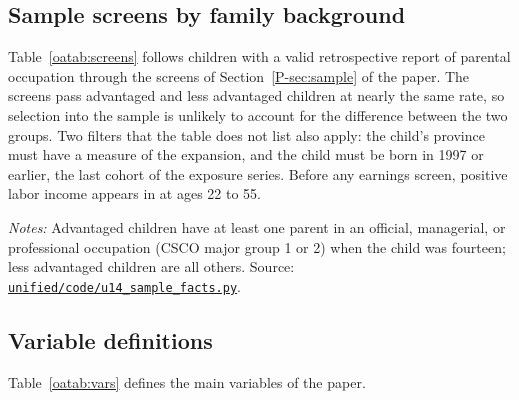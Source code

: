 \documentclass[11pt]{article}
\numberwithin{equation}{section}
\newcommand{\repourl}{https://github.com/JiachenJin1001/before-the-labor-market-or-inside-it}
\newcommand{\code}[1]{\href{\repourl/blob/main/#1}{\nolinkurl{#1}}}
\begin{document}
\subsection{Sample screens by family background}

Table~\ref{oatab:screens} follows children with a valid retrospective
report of parental occupation through the screens of
Section~\ref{P-sec:sample} of the paper. The screens pass advantaged
and less advantaged children at nearly the same rate, so selection into the sample is unlikely to account for the difference between the two groups. Two filters that the table does not list also apply: the child's province must have a measure of the expansion, and the child must be born in 1997 or earlier, the last cohort of the exposure series. Before
any earnings screen, positive labor income appears in
 at ages 22 to 55. 

\begin{table}[H]
\centering
\small
\caption{Sample screens by family background.}
\label{oatab:screens}
\setlength{\tabcolsep}{4pt}

\par\smallskip
\begin{minipage}{0.92\textwidth}
\footnotesize\emph{Notes:} Advantaged children have at least one
parent in an official, managerial, or professional occupation (CSCO
major group 1 or 2) when the child was fourteen; less advantaged children are
all others. Source: \code{unified/code/u14_sample_facts.py}.
\end{minipage}
\end{table}

\subsection{Variable definitions}

Table~\ref{oatab:vars} defines the main variables of the paper.
\end{document}
